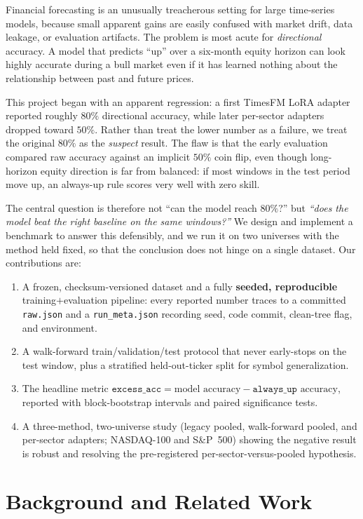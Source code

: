 \documentclass[11pt]{article}
\newcommand{\excess}{\texttt{excess\_acc}}
\newcommand{\alwaysup}{\texttt{always\_up}}
\begin{document}
Financial forecasting is an unusually treacherous setting for large time-series
models, because small apparent gains are easily confused with market drift, data
leakage, or evaluation artifacts. The problem is most acute for \emph{directional}
accuracy. A model that predicts ``up'' over a six-month equity horizon can look
highly accurate during a bull market even if it has learned nothing about the
relationship between past and future prices.

This project began with an apparent regression: a first TimesFM LoRA adapter
reported roughly $80\%$ directional accuracy, while later per-sector adapters dropped
toward $50\%$. Rather than treat the lower number as a failure, we treat the original
$80\%$ as the \emph{suspect} result. The flaw is that the early evaluation compared
raw accuracy against an implicit $50\%$ coin flip, even though long-horizon equity
direction is far from balanced: if most windows in the test period move up, an
always-up rule scores very well with zero skill.

The central question is therefore not ``can the model reach $80\%$?'' but
\emph{``does the model beat the right baseline on the same windows?''} We design and
implement a benchmark to answer this defensibly, and we run it on two universes with
the method held fixed, so that the conclusion does not hinge on a single dataset.
Our contributions are:
\begin{enumerate}
  \item A frozen, checksum-versioned dataset and a fully \textbf{seeded, reproducible}
  training$+$evaluation pipeline: every reported number traces to a committed
  \texttt{raw.json} and a \texttt{run\_meta.json} recording seed, code commit, clean-tree
  flag, and environment.
  \item A walk-forward train/validation/test protocol that never early-stops on the
  test window, plus a stratified held-out-ticker split for symbol generalization.
  \item The headline metric $\excess = \text{model accuracy} - \alwaysup\text{ accuracy}$,
  reported with block-bootstrap intervals and paired significance tests.
  \item A three-method, two-universe study (legacy pooled, walk-forward pooled, and
  per-sector adapters; NASDAQ-100 and S\&P~500) showing the negative result is robust
  and resolving the pre-registered per-sector-versus-pooled hypothesis.
\end{enumerate}

\section{Background and Related Work}
\end{document}
